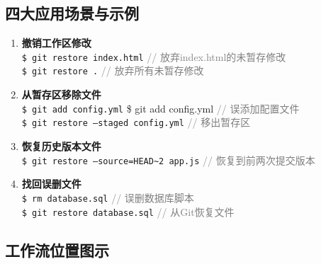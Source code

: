 \subsection{四大应用场景与示例}
\begin{enumerate}[leftmargin=*, nosep]
    \item \textbf{撤销工作区修改} \\
    \texttt{\$ git restore index.html} \quad \textcolor{gray}{// 放弃index.html的未暂存修改} \\
    \texttt{\$ git restore .} \quad \textcolor{gray}{// 放弃所有未暂存修改}
    
    \item \textbf{从暂存区移除文件} \\
    \texttt{\$ git add config.yml} {\$ git add config.yml} \quad \textcolor{gray}{// 误添加配置文件} \\
    \texttt{\$ git restore --staged config.yml} \quad \textcolor{gray}{// 移出暂存区}
    
    \item \textbf{恢复历史版本文件} \\
      \texttt{\$ git restore --source=HEAD\textasciitilde2 app.js} \quad \textcolor{gray}{// 恢复到前两次提交版本}
    
    \item \textbf{找回误删文件} \\
    \texttt{\$ rm database.sql} \quad \textcolor{gray}{// 误删数据库脚本} \\
    \texttt{\$ git restore database.sql} \quad \textcolor{gray}{// 从Git恢复文件}
\end{enumerate}

\subsection{工作流位置图示}
\begin{center}
\end{center}

